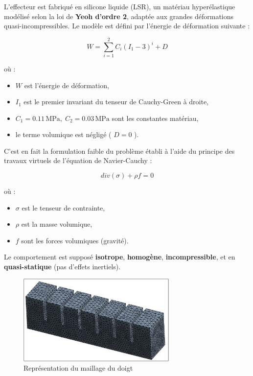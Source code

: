 \documentclass[a4paper, 11pt]{report}
\begin{document}
            L'effecteur est fabriqué en silicone liquide (LSR), un matériau hyperélastique modélisé selon la loi de \textbf{Yeoh d'ordre 2}, adaptée aux grandes déformations quasi-incompressibles. Le modèle est défini par l'énergie de déformation suivante :

            \[
            W = \sum_{i=1}^{2} C_i (I_1 - 3)^i + D
            \]

            où :
            \begin{itemize}
            \item \( W \) est l'énergie de déformation,
            \item \( I_1 \) est le premier invariant du tenseur de Cauchy-Green à droite,
            \item \( C_1 = 0.11\,\text{MPa},\; C_2 = 0.03\,\text{MPa} \) sont les constantes matériau,
            \item le terme volumique est négligé ( \( D = 0 \) ).
            \end{itemize}

            C'est en fait la formulation faible du problème établi à l'aide du principe des travaux virtuels de l'équation de Navier-Cauchy :

            \[
            div(\sigma) + \rho f = 0
            \]

            où :
            \begin{itemize}
            \item \( \sigma \) est le tenseur de contrainte,
            \item \( \rho \) est la masse volumique,
            \item \( f \) sont les forces volumiques (gravité).
            \end{itemize}

            Le comportement est supposé \textbf{isotrope}, \textbf{homogène}, \textbf{incompressible}, et en \textbf{quasi-statique} (pas d’effets inertiels).

            \begin{figure}
                \centering
                \includegraphics[width=0.7\textwidth]{Figures/doigt_finit_elements.jpg}
                \caption{Représentation du maillage du doigt \cite{bhat_numerical_2025}}
                \label{fig:doigt_finit_elements}
            \end{figure}
\end{document}
